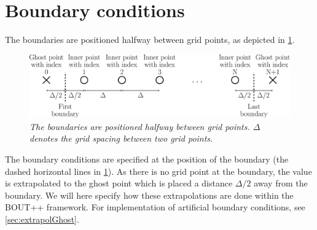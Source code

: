 \section{Boundary conditions}
%
The boundaries are positioned halfway between grid points, as depicted in \cref{fig:flatBC}.
%
\begin{figure}[htb]
    \centering
    \includegraphics[width=1.0\textwidth]{fig/flatGrid}
    \caption{\textit{
            The boundaries are positioned halfway between grid points.
            $\Delta$ denotes the grid spacing between two grid points.
        }}
    \label{fig:flatBC}
\end{figure}
%

\noindent
The boundary conditions are specified at the position of the boundary (the dashed horizontal lines in \cref{fig:flatBC}).
As there is no grid point at the boundary, the value is extrapolated to the ghost point which is placed a distance $\Delta/2$ away from the boundary.
We will here specify how these extrapolations are done within the BOUT++ framework.
For implementation of artificial boundary conditions, see \cref{sec:extrapolGhost}.

